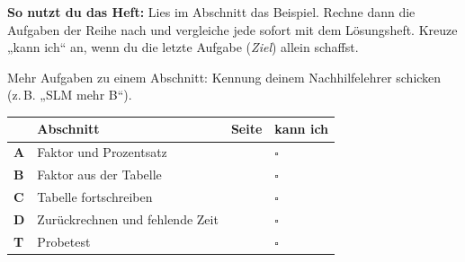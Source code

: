 \documentclass[11pt]{article}
\newlength{\kr}
\begin{document}
\par\smallskip
{}\par\medskip
\noindent\textbf{So nutzt du das Heft:} Lies im Abschnitt das Beispiel. Rechne dann die Aufgaben der Reihe nach und vergleiche jede sofort mit dem Lösungsheft. Kreuze „kann ich“ an, wenn du die letzte Aufgabe (\emph{Ziel}) allein schaffst.\par
\noindent Mehr Aufgaben zu einem Abschnitt: Kennung deinem Nachhilfelehrer schicken (z.\,B. „SLM mehr B“).\par\medskip
{\renewcommand{\arraystretch}{1.3}
\noindent\begin{tabular}{|>{\bfseries}p{10mm}|p{112mm}|>{\raggedleft\arraybackslash}p{10mm}|>{\centering\arraybackslash}p{14mm}|}\hline
\rowcolor{black!8} & \textbf{Abschnitt} & \textbf{Seite} & \textbf{kann ich}\\\hline
A & Faktor und Prozentsatz & \pageref{s:A} & $\square$\\\hline
B & Faktor aus der Tabelle & \pageref{s:B} & $\square$\\\hline
C & Tabelle fortschreiben & \pageref{s:C} & $\square$\\\hline
D & Zurückrechnen und fehlende Zeit & \pageref{s:D} & $\square$\\\hline
T & Probetest & \pageref{s:T} & $\square$\\\hline
\end{tabular}}\par\bigskip
\end{document}
